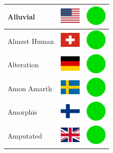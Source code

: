 \documentclass[12pt, a4paper, twoside]{report}
\begin{document}
\begin{center}
\begin{longtable}{|p{5cm}|p{2cm}|p{2cm}|}
Alluvial & \includegraphics[width=1cm]{4x3/us} & \includegraphics[width=1cm]{likes/y} \\ \hline
Almøst Human & \includegraphics[width=1cm]{4x3/ch} & \includegraphics[width=1cm]{likes/y} \\ \hline
Alteration & \includegraphics[width=1cm]{4x3/de} & \includegraphics[width=1cm]{likes/y} \\ \hline
Amon Amarth & \includegraphics[width=1cm]{4x3/se} & \includegraphics[width=1cm]{likes/y} \\ \hline
Amorphis & \includegraphics[width=1cm]{4x3/fi} & \includegraphics[width=1cm]{likes/y} \\ \hline
Amputated & \includegraphics[width=1cm]{4x3/gb} & \includegraphics[width=1cm]{likes/y} \\ \hline

\end{longtable}
\end{center}
\end{document}
